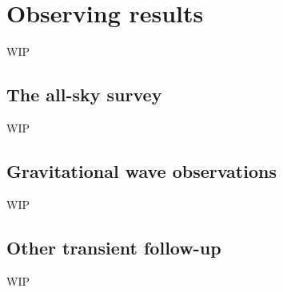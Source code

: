 \section{Observing results}
\label{sec:observing}
\begin{colsection}


\begin{colsection}

WIP

\end{colsection}


\subsection{The all-sky survey}
\label{sec:survey_results}
\begin{colsection}

WIP

\end{colsection}


\subsection{Gravitational wave observations}
\label{sec:gw_results}
\begin{colsection}

WIP

\end{colsection}


\subsection{Other transient follow-up}
\label{sec:other_results}
\begin{colsection}

WIP

\end{colsection}


\end{colsection}

